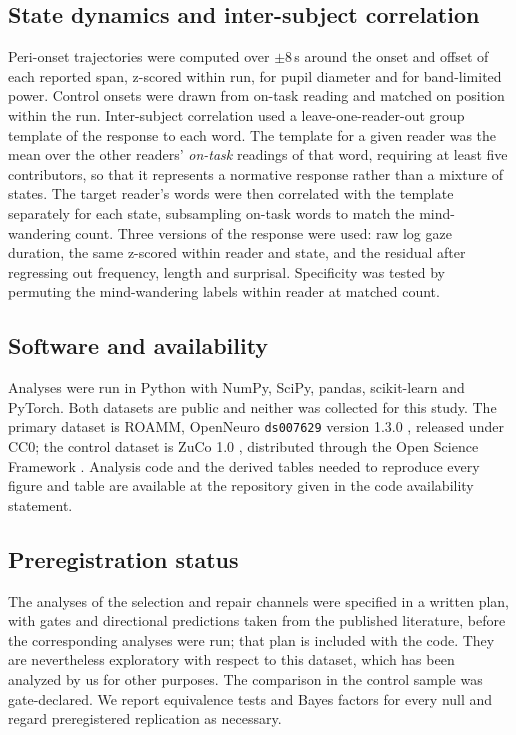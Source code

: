 \documentclass[11pt]{article}
\begin{document}
\subsection{State dynamics and inter-subject correlation}

Peri-onset trajectories were computed over $\pm 8$\,s around the onset and offset of each
reported span, z-scored within run, for pupil diameter and for band-limited power. Control
onsets were drawn from on-task reading and matched on position within the run. Inter-subject
correlation used a leave-one-reader-out group template of the response to each word. The
template for a given reader was the mean over the other readers' \emph{on-task} readings of that
word, requiring at least five contributors, so that it represents a normative response rather
than a mixture of states. The target reader's words were then correlated with the template
separately for each state, subsampling on-task words to match the mind-wandering count. Three
versions of the response were used: raw log gaze duration, the same z-scored within reader and
state, and the residual after regressing out frequency, length and surprisal. Specificity was
tested by permuting the mind-wandering labels within reader at matched count.

\subsection{Software and availability}

Analyses were run in Python with NumPy, SciPy, pandas, scikit-learn and PyTorch. Both datasets
are public and neither was collected for this study. The primary dataset is ROAMM, OpenNeuro
\texttt{ds007629} version 1.3.0 \citep{roammdata}, released under CC0; the control dataset is
ZuCo 1.0 \citep{hollenstein2018}, distributed through the Open Science Framework
\citep{zucodata}. Analysis code and the derived tables needed to reproduce every figure and
table are available at the repository given in the code availability statement.

\subsection{Preregistration status}

The analyses of the selection and repair channels were specified in a written plan, with gates
and directional predictions taken from the published literature, before the corresponding
analyses were run; that plan is included with the code. They are nevertheless exploratory with
respect to this dataset, which has been analyzed by us for other purposes. The comparison in
the control sample was gate-declared. We report equivalence tests and Bayes factors for every
null and regard preregistered replication as necessary.
\end{document}
